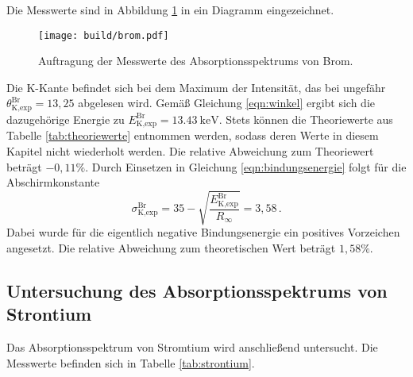 Die Messwerte sind in Abbildung \ref{fig:brom} in ein Diagramm eingezeichnet.

\begin{figure}
  \centering
  \texttt{[image: build/brom.pdf]}
  \caption{Auftragung der Messwerte des Absorptionsspektrums von Brom.}
  \label{fig:brom}
\end{figure}

Die K-Kante befindet sich bei dem Maximum der Intensität, das bei ungefähr
$\theta_{\text{K,exp}}^{\text{Br}} = 13{,}25$ abgelesen wird. Gemäß Gleichung \eqref{eqn:winkel} ergibt sich die dazugehörige Energie
zu $E_{\text{K,exp}}^{\text{Br}} = \SI{13.43}{\kilo\electronvolt}$.
Stets können die Theoriewerte aus Tabelle \ref{tab:theoriewerte} entnommen werden,
sodass deren Werte in diesem Kapitel nicht wiederholt werden. Die relative Abweichung zum Theoriewert
beträgt $-0{,}11\%$. Durch Einsetzen in Gleichung \eqref{eqn:bindungsenergie}
folgt für die Abschirmkonstante
\begin{equation*}
  \sigma_{\text{K,exp}}^{\text{Br}} =  35 - \sqrt{\frac{E_{\text{K,exp}}^{\text{Br}}}{R_\infty}} = 3{,}58\,.
\end{equation*}
Dabei wurde für die eigentlich negative Bindungsenergie ein positives Vorzeichen angesetzt.
Die relative Abweichung zum theoretischen Wert beträgt $1{,}58\%$.

\subsection{Untersuchung des Absorptionsspektrums von Strontium}
\label{subsec:strontium}

Das Absorptionsspektrum von Stromtium wird anschließend untersucht.
Die Messwerte befinden sich in Tabelle \ref{tab:strontium}.

